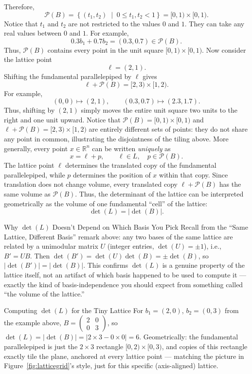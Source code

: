 Therefore,
\[
\mathcal{P}(B)
=
\left\{
(t_1,t_2)
\;\middle|\;
0\leq t_1,t_2<1
\right\}
=
[0,1)\times[0,1).
\]
Notice that $t_1$ and $t_2$ are not restricted to the values $0$ and
$1$. They can take any real values between $0$ and $1$. For example,
\[
0.3b_1+0.7b_2
=
(0.3,0.7)
\in\mathcal{P}(B).
\]
Thus, $\mathcal{P}(B)$ contains every point in the unit square
$[0,1)\times[0,1)$.
Now consider the lattice point
\[
\ell=(2,1).
\]
Shifting the fundamental parallelepiped by $\ell$ gives
\[
\ell+\mathcal{P}(B)
=
[2,3)\times[1,2).
\]
For example,
\[
(0,0)\mapsto(2,1),
\qquad
(0.3,0.7)\mapsto(2.3,1.7).
\]
Thus, shifting by $(2,1)$ simply moves the entire unit square two
units to the right and one unit upward. Notice that
$\mathcal{P}(B)=[0,1)\times[0,1)$ and
$\ell+\mathcal{P}(B)=[2,3)\times[1,2)$ are entirely different sets of
points: they do not share any point in common, illustrating the
disjointness of the tiling above.
More generally, every point $x\in\mathbb{R}^n$ can be written
\emph{uniquely} as
\[
x=\ell+p,
\qquad
\ell\in L,\quad p\in\mathcal{P}(B).
\]
The lattice point $\ell$ determines the translated copy of the
fundamental parallelepiped, while $p$ determines the position of $x$
within that copy.
Since translation does not change volume, every translated copy
$\ell+\mathcal{P}(B)$ has the same volume as $\mathcal{P}(B)$. Thus,
the determinant of the lattice can be interpreted geometrically as
the volume of one fundamental ``cell'' of the lattice:
\[
\boxed{\det(L)=|\det(B)|.}
\]

\begin{rmkbox}{Why $\det(L)$ Doesn't Depend on Which Basis You Pick}
Recall from the ``Same Lattice, Different Basis'' remark above: any two bases of the same lattice are related by a unimodular matrix $U$ (integer entries, $\det(U) = \pm 1$), i.e., $B' = UB$. Then $\det(B') = \det(U)\det(B) = \pm \det(B)$, so $|\det(B')| = |\det(B)|$. This confirms $\det(L)$ is a genuine property of the lattice itself, not an artifact of which basis happened to be used to compute it --- exactly the kind of basis-independence you should expect from something called ``the volume of the lattice.''
\end{rmkbox}

\begin{exbox}{Computing $\det(L)$ for the Tiny Lattice}
For $b_1=(2,0)$, $b_2=(0,3)$ from the example above, $B = \begin{pmatrix} 2 & 0 \\ 0 & 3 \end{pmatrix}$, so $\det(L) = |\det(B)| = |2 \times 3 - 0 \times 0| = 6$. Geometrically: the fundamental parallelepiped is just the $2\times 3$ rectangle $[0,2)\times[0,3)$, and copies of this rectangle exactly tile the plane, anchored at every lattice point --- matching the picture in Figure~\ref{fig:latticegrid}'s style, just for this specific (axis-aligned) lattice.
\end{exbox}

